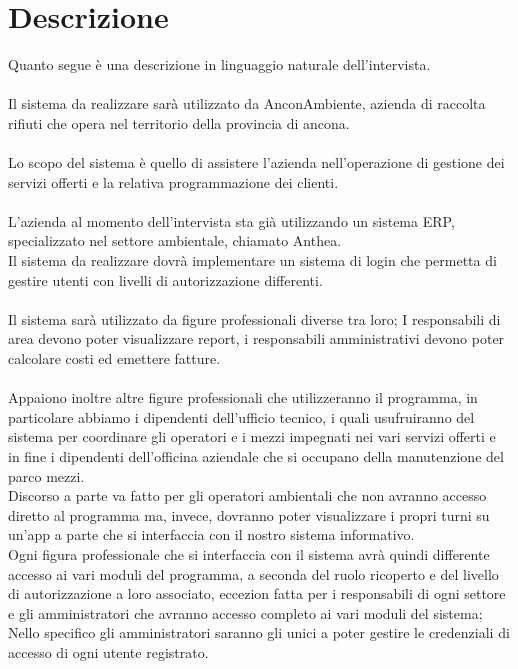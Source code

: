 \documentclass[green, fancy, 11pt]{elegantbook}
\begin{document}
\newpage

\section{Descrizione}
\noindent Quanto segue è una descrizione in linguaggio naturale dell’intervista.\\
\\
Il sistema da realizzare sarà utilizzato da AnconAmbiente, azienda di raccolta rifiuti che opera nel territorio della provincia di ancona.\\
\\
Lo scopo del sistema è quello di assistere l’azienda nell’operazione di gestione dei servizi offerti e la relativa programmazione dei clienti.\\
\\
L’azienda al momento dell’intervista sta già utilizzando un sistema ERP, specializzato nel settore ambientale, chiamato Anthea.\\
Il sistema da realizzare dovrà implementare un sistema di login che permetta di gestire utenti con livelli di autorizzazione differenti.\\
\\
Il sistema sarà utilizzato da figure professionali diverse tra loro; I responsabili di area devono poter visualizzare report, i responsabili amministrativi devono poter calcolare costi ed emettere fatture.\\
\\
Appaiono inoltre altre figure professionali che utilizzeranno il programma, in particolare abbiamo i dipendenti dell’ufficio tecnico, i quali usufruiranno del sistema per coordinare gli operatori e i mezzi impegnati nei vari servizi offerti e in fine i dipendenti dell’officina aziendale che si occupano della manutenzione del parco mezzi.\\
Discorso a parte va fatto per gli operatori ambientali che non avranno accesso diretto al programma ma, invece, dovranno poter visualizzare i propri turni su un’app a parte che si interfaccia con il nostro sistema informativo.\\
Ogni figura professionale che si interfaccia con il sistema avrà quindi differente accesso ai vari moduli del programma, a seconda del ruolo ricoperto e del livello di autorizzazione a loro associato, eccezion fatta per i responsabili di ogni settore e gli amministratori che avranno accesso completo ai vari moduli del sistema; Nello specifico gli amministratori saranno gli unici a poter gestire le credenziali di accesso di ogni utente registrato.\\
\end{document}
